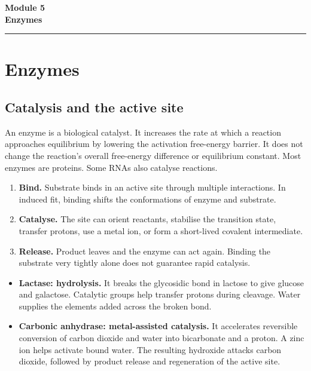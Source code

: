 \documentclass[12pt,a4paper]{article}
\newcommand{\currmodule}{Module 1}
\newcommand{\modulestart}[2]{%
  \clearpage
  \renewcommand{\currmodule}{Module #1}%
  \renewcommand{\theHsection}{mod#1.\arabic{section}}%
  \renewcommand{\theHsubsection}{\theHsection.\arabic{subsection}}%
  \renewcommand{\theHsubsubsection}{\theHsubsection.\arabic{subsubsection}}%
  \phantomsection
  \addcontentsline{toc}{part}{Module #1: #2}%
  \setcounter{section}{0}%
  \begin{center}
    \vspace*{1.0cm}
    {\Huge\bfseries\color{myred} Module #1}\\[10pt]
    {\Large\bfseries\color{mydark} #2}\\[10pt]
    {\color{myred}\rule{0.55\linewidth}{1.2pt}}
  \end{center}
  \vspace{14pt}
}
\begin{document}
\modulestart{5}{Enzymes}

\section{Enzymes}
\subsection{Catalysis and the active site}
\begin{tcolorbox}[defbox, title={Enzyme}]
An enzyme is a biological catalyst. It increases the rate at which a reaction approaches equilibrium by lowering the activation free-energy barrier. It does not change the reaction's overall free-energy difference or equilibrium constant. Most enzymes are proteins. Some RNAs also catalyse reactions.
\end{tcolorbox}

\begin{enumerate}[leftmargin=*, itemsep=3pt, topsep=4pt]
  \item \textbf{Bind.} Substrate binds in an active site through multiple interactions. In induced fit, binding shifts the conformations of enzyme and substrate.
  \item \textbf{Catalyse.} The site can orient reactants, stabilise the transition state, transfer protons, use a metal ion, or form a short-lived covalent intermediate.
  \item \textbf{Release.} Product leaves and the enzyme can act again. Binding the substrate very tightly alone does not guarantee rapid catalysis.
\end{enumerate}
\begin{tcolorbox}[examplebox, title={Two mechanisms with different chemical roles}]
\begin{itemize}[leftmargin=*, itemsep=3pt, topsep=4pt]
  \item \textbf{Lactase: hydrolysis.} It breaks the glycosidic bond in lactose to give glucose and galactose. Catalytic groups help transfer protons during cleavage. Water supplies the elements added across the broken bond.
  \item \textbf{Carbonic anhydrase: metal-assisted catalysis.} It accelerates reversible conversion of carbon dioxide and water into bicarbonate and a proton. A zinc ion helps activate bound water. The resulting hydroxide attacks carbon dioxide, followed by product release and regeneration of the active site.
\end{itemize}
\end{tcolorbox}
\end{document}
